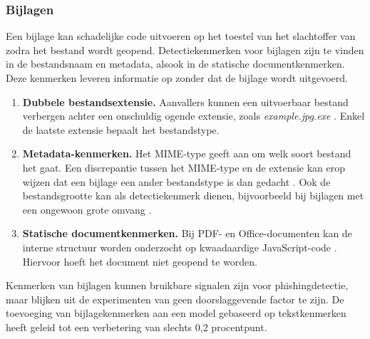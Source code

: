 \subsubsection{Bijlagen}
\label{subsubsec:bijlagen}

Een bijlage kan schadelijke code uitvoeren op het toestel van het slachtoffer van zodra het bestand wordt geopend. 
Detectiekenmerken voor bijlagen zijn te vinden in de bestandsnaam en metadata, alsook in de statische documentkenmerken. Deze kenmerken leveren informatie op zonder dat de bijlage wordt uitgevoerd.

\begin{enumerate}
    \item \textbf{Dubbele bestandsextensie.} Aanvallers kunnen een uitvoerbaar bestand verbergen achter een onschuldig ogende extensie, zoals \emph{example.jpg.exe} \autocite{Alazab2016}. Enkel de laatste extensie bepaalt het bestandstype.
    \item \textbf{Metadata-kenmerken.} Het MIME-type geeft aan om welk soort bestand het gaat. Een discrepantie tussen het MIME-type en de extensie kan erop wijzen dat een bijlage een ander bestandstype is dan gedacht \autocite{Mendes2025}. Ook de bestandsgrootte kan als detectiekenmerk dienen, bijvoorbeeld bij bijlagen met een ongewoon grote omvang \autocite{Mendes2025}.
    \item \textbf{Statische documentkenmerken.} Bij PDF- en Office-documenten kan de interne structuur worden onderzocht op kwaadaardige JavaScript-code \autocite{Srndic2013}. Hiervoor hoeft het document niet geopend te worden.
\end{enumerate}

Kenmerken van bijlagen kunnen bruikbare signalen zijn voor phishingdetectie, maar blijken uit de experimenten van \textcite{Mendes2025} geen doorslaggevende factor te zijn. De toevoeging van bijlagekenmerken aan een model gebaseerd op tekstkenmerken heeft geleid tot een verbetering van slechts 0,2 procentpunt.
